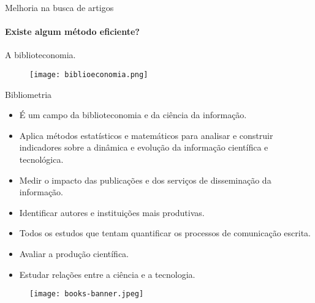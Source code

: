 \begin{frame}[t]{Melhoria na busca de artigos}
    \framesubtitle{Existe algum método eficiente?}
    A biblioteconomia.

    \begin{figure}
        \texttt{[image: biblioeconomia.png]}
    \end{figure}
\end{frame}
\begin{frame}[t]{Bibliometria}
    \begin{itemize}
        \item É um campo da biblioteconomia e da ciência da informação.
        \item Aplica métodos estatísticos e matemáticos para analisar e construir indicadores sobre a dinâmica e evolução da informação científica e tecnológica.
        \item Medir o impacto das publicações e dos serviços de disseminação da informação.
        \item Identificar autores e instituições mais produtivas.
        \item Todos os estudos que tentam quantificar os processos de comunicação escrita. \cite{pritchard1969statistical}
        \item Avaliar a produção científica. \cite{costa2020ciencia}
        \item Estudar relações entre a ciência e a tecnologia. \cite{maricato2010dinamica}
    \end{itemize}

    \begin{figure}
        \texttt{[image: books-banner.jpeg]}
    \end{figure}

\end{frame}
